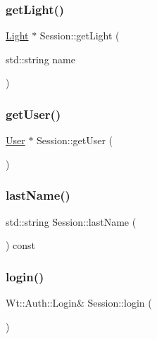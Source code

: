 \mbox{\label{class_session_acce07120fe6fe2cb3a63f1ba119d27d9}} 
\subsubsection{\texorpdfstring{get\+Light()}{getLight()}}
{\footnotesize\ttfamily \hyperlink{class_light}{Light} $\ast$ Session\+::get\+Light (\begin{DoxyParamCaption}\item[{std\+::string}]{name }\end{DoxyParamCaption})}

\mbox{\label{class_session_aa01be017bbea5350214c2ddff5512073}} 
\subsubsection{\texorpdfstring{get\+User()}{getUser()}}
{\footnotesize\ttfamily \hyperlink{class_user}{User} $\ast$ Session\+::get\+User (\begin{DoxyParamCaption}{ }\end{DoxyParamCaption})}

\mbox{\label{class_session_acea6101a22c15bb77c7f30235088fb85}} 
\subsubsection{\texorpdfstring{last\+Name()}{lastName()}}
{\footnotesize\ttfamily std\+::string Session\+::last\+Name (\begin{DoxyParamCaption}{ }\end{DoxyParamCaption}) const}

\mbox{\label{class_session_ac9b69619756936d8f27bc6702c334b1f}} 
\subsubsection{\texorpdfstring{login()}{login()}}
{\footnotesize\ttfamily Wt\+::\+Auth\+::\+Login\& Session\+::login (\begin{DoxyParamCaption}{ }\end{DoxyParamCaption})\hspace{0.3cm}{\ttfamily [inline]}}

